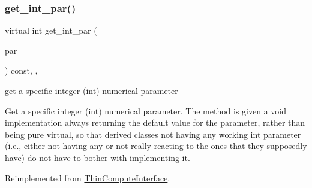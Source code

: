 \mbox{\label{class_s_m_spp__di__unipi__it_1_1_f_real_objective_aaaa5e72533153b149c26c1cc7ab1fe70}} 
\subsubsection{\texorpdfstring{get\+\_\+int\+\_\+par()}{get\_int\_par()}}
{\footnotesize\ttfamily virtual int get\+\_\+int\+\_\+par (\begin{DoxyParamCaption}\item[{const \mbox{\hyperlink{class_s_m_spp__di__unipi__it_1_1_thin_compute_interface_aa3d710629ad8c434286726ad810c3b47}{idx\+\_\+type}}}]{par }\end{DoxyParamCaption}) const\hspace{0.3cm}{\ttfamily [inline]}, {\ttfamily [override]}, {\ttfamily [virtual]}}



get a specific integer (int) numerical parameter 

Get a specific integer (int) numerical parameter. The method is given a void implementation always returning the default value for the parameter, rather than being pure virtual, so that derived classes not having any working int parameter (i.\+e., either not having any or not really reacting to the ones that they supposedly have) do not have to bother with implementing it. 

Reimplemented from \mbox{\hyperlink{class_s_m_spp__di__unipi__it_1_1_thin_compute_interface_a9403da6fd83a275dfdf21ec4db71c744}{Thin\+Compute\+Interface}}.

\mbox{\label{class_s_m_spp__di__unipi__it_1_1_f_real_objective_acc8ac3c57cc2c71ac3fe6c409fe53074}} 
